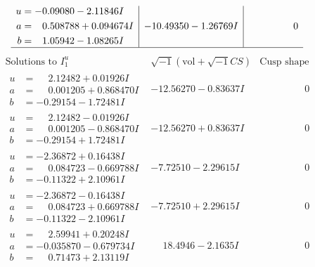 \documentclass[1p]{elsarticle_modified}
\theoremstyle{definition}
\newcommand{\I}{\sqrt{-1}}
\begin{document}
$$\begin{array}{c|c|c}
\begin{aligned}
u &= -0.09080 - 2.11846 I \\
a &= \phantom{-}0.508788 + 0.094674 I \\
b &= \phantom{-}1.05942 - 1.08265 I\end{aligned}
 & -10.49350 - 1.26769 I & \phantom{-0.000000 } 0\\
 \hline 
 \end{array}$$\newpage$$\begin{array}{c|c|c}  
\text{Solutions to }I^u_{1}& \I (\text{vol} + \sqrt{-1}CS) & \text{Cusp shape}\\
 \hline 
\begin{aligned}
u &= \phantom{-}2.12482 + 0.01926 I \\
a &= \phantom{-}0.001205 + 0.868470 I \\
b &= -0.29154 - 1.72481 I\end{aligned}
 & -12.56270 - 0.83637 I & \phantom{-0.000000 } 0 \\ \hline\begin{aligned}
u &= \phantom{-}2.12482 - 0.01926 I \\
a &= \phantom{-}0.001205 - 0.868470 I \\
b &= -0.29154 + 1.72481 I\end{aligned}
 & -12.56270 + 0.83637 I & \phantom{-0.000000 } 0 \\ \hline\begin{aligned}
u &= -2.36872 + 0.16438 I \\
a &= \phantom{-}0.084723 - 0.669788 I \\
b &= -0.11322 + 2.10961 I\end{aligned}
 & -7.72510 - 2.29615 I & \phantom{-0.000000 } 0 \\ \hline\begin{aligned}
u &= -2.36872 - 0.16438 I \\
a &= \phantom{-}0.084723 + 0.669788 I \\
b &= -0.11322 - 2.10961 I\end{aligned}
 & -7.72510 + 2.29615 I & \phantom{-0.000000 } 0 \\ \hline\begin{aligned}
u &= \phantom{-}2.59941 + 0.20248 I \\
a &= -0.035870 - 0.679734 I \\
b &= \phantom{-}0.71473 + 2.13119 I\end{aligned}
 & \phantom{-}18.4946 - 2.1635 I & \phantom{-0.000000 } 0 \\ \hline\begin{aligned}

\end{aligned}
\end{array}$$
\end{document}

